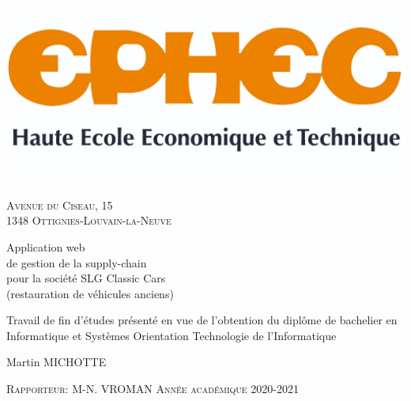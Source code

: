 \documentclass[french, 12pt, a4paper]{article}
\begin{document}

\begin{titlepage}
\begin{center}

\includegraphics[width=15cm]{img/ephec.jpg}~\\
\textsc{Avenue du Ciseau, 15 \\ 1348 Ottignies-Louvain-la-Neuve} \\[1.5cm]

{\huge \bfseries \begin{spacing}{1.25}
  Application web \\ 
  de gestion de la supply-chain \\
  pour la société SLG Classic Cars \\
  \LARGE(restauration de véhicules anciens)
  \\[2cm]
  \end{spacing} 
} 

{\large 
  Travail de fin d'études présenté en vue de l'obtention du diplôme de bachelier
  en Informatique et Systèmes Orientation Technologie de l'Informatique
  \\[2cm]
}

{\LARGE 
  Martin MICHOTTE
}

\vspace*{\fill}
\textsc{\large Rapporteur: M-N. VROMAN}
\hfill
\textsc{\large Année académique 2020-2021}

\end{center}
\end{titlepage}





\newpage
{}
\renewcommand{\contentsname}{Table des matières}
\tableofcontents

\end{document}
